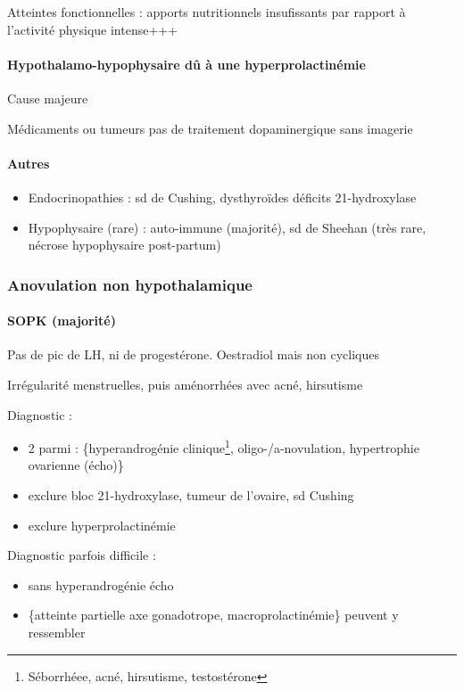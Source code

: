 \documentclass[11pt]{article}
\begin{document}
Atteintes fonctionnelles : apports nutritionnels insufissants par rapport à l'activité physique intense+++
\paragraph{Hypothalamo-hypophysaire dû à une hyperprolactinémie}
\label{sec:orga1b3af4}
Cause majeure

Médicaments ou tumeurs \thus pas de traitement dopaminergique sans imagerie \danger
\paragraph{Autres}
\label{sec:org7e3b492}
\begin{itemize}
\item Endocrinopathies : sd de Cushing, dysthyroïdes déficits 21-hydroxylase
\item Hypophysaire (rare) : auto-immune (majorité), sd de Sheehan (très rare, nécrose hypophysaire post-partum)
\end{itemize}
\subsubsection{Anovulation non hypothalamique}
\label{sec:orgb7614a0}
\paragraph{SOPK (majorité)}
\label{sec:orgbefb2df}
Pas de pic de LH, ni de progestérone. Oestradiol mais non cycliques

Irrégularité menstruelles, puis aménorrhées avec acné, hirsutisme

Diagnostic :
\begin{itemize}
\item 2 parmi : \{hyperandrogénie clinique\footnote{Séborrhéee, acné, hirsutisme, \inc testostérone}, oligo-/a-novulation, hypertrophie
ovarienne (écho)\}
\item exclure bloc 21-hydroxylase, tumeur de l'ovaire, sd Cushing
\item exclure hyperprolactinémie
\end{itemize}

Diagnostic parfois difficile :
\begin{itemize}
\item sans hyperandrogénie \thus écho
\item \{atteinte partielle axe gonadotrope, macroprolactinémie\} peuvent y ressembler
\end{itemize}
\end{document}
